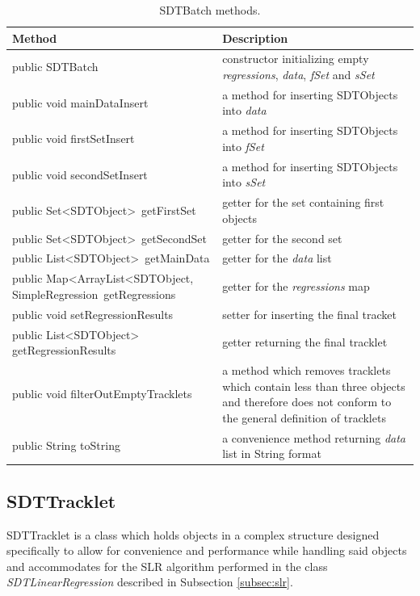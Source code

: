 \begin{table}[H]
\centering
\setlength{\extrarowheight}{2pt}
\begin{tabularx}{\textwidth}{|X|X|}
\hline
\textbf{Method} & \textbf{Description} \\ \hline
public \mbox{SDTBatch} & constructor initializing empty \emph{regressions}, \emph{data}, \emph{fSet} and \emph{sSet} \\ \hline
public void \mbox{mainDataInsert} & a method for inserting \mbox{SDTObjects} into \emph{data} \\ \hline
public void \mbox{firstSetInsert} & a method for inserting \mbox{SDTObjects} into \emph{fSet} \\ \hline
public void \mbox{secondSetInsert} & a method for inserting \mbox{SDTObjects} into \emph{sSet} \\ \hline
public \mbox{Set<SDTObject> getFirstSet} & getter for the set containing first objects \\ \hline
public \mbox{Set<SDTObject> getSecondSet} & getter for the second set \\ \hline
public \mbox{List<SDTObject> getMainData} & getter for the \emph{data} list \\ \hline
public \mbox{Map<ArrayList<SDTObject,} \mbox{SimpleRegression getRegressions} & getter for the \emph{regressions} map \\ \hline
public void \mbox{setRegressionResults} & setter for inserting the final tracket \\ \hline
public \mbox{List<SDTObject>} \mbox{getRegressionResults} & getter returning the final tracklet \\ \hline
public void \mbox{filterOutEmptyTracklets} & a method which removes tracklets which contain less than three objects and therefore does not conform to the general definition of tracklets \\ \hline
public String \mbox{toString} & a convenience method returning \emph{data} list in String format \\ \hline
\end{tabularx}
\caption{SDTBatch methods.}
\label{tab:class_methods_B}
\end{table}

\newpage

\subsection{SDTTracklet}\label{subsec:tracklet}

	SDTTracklet is a class which holds objects in a complex structure designed specifically to allow for convenience and performance while handling said objects and accommodates for the SLR algorithm performed in the class \emph{SDTLinearRegression} described in Subsection \ref{subsec:slr}.
	
